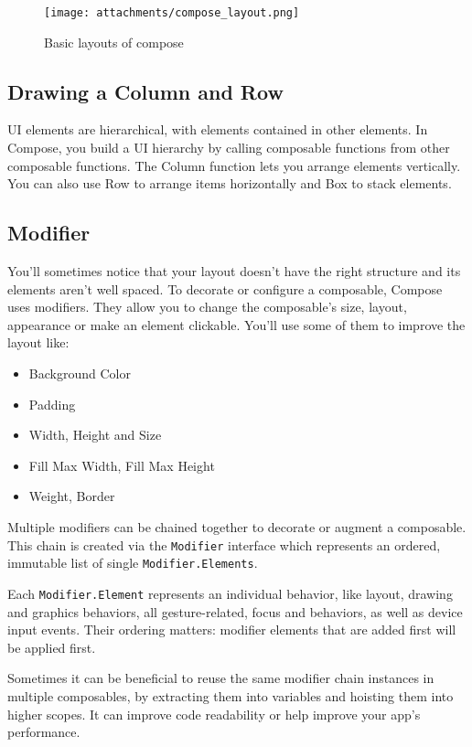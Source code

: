 \documentclass[12pt,oneside]{book}
\begin{document}
\begin{figure}
    \centering
        \texttt{[image: attachments/compose\_layout.png]}
    \caption{Basic layouts of compose}
\end{figure}

        \subsection{Drawing a Column and Row}
UI elements are hierarchical, with elements contained in other elements. In Compose, you build a UI hierarchy by calling composable functions from other composable functions. The Column function lets you arrange elements vertically. You can also use Row to arrange items horizontally and Box to stack elements.

        \subsection{Modifier}
You'll sometimes notice that your layout doesn't have the right structure and its elements aren't well spaced. To decorate or configure a composable, Compose uses modifiers. They allow you to change the composable's size, layout, appearance or make an element clickable. You'll use some of them to improve the layout like:
\begin{itemize}
    \item Background Color
    \item Padding
    \item Width, Height and Size
    \item Fill Max Width, Fill Max Height
    \item Weight, Border
\end{itemize}
Multiple modifiers can be chained together to decorate or augment a composable. This chain is created via the \texttt{Modifier} interface which represents an ordered, immutable list of single \texttt{Modifier.Elements}.

Each \texttt{Modifier.Element} represents an individual behavior, like layout, drawing and graphics behaviors, all gesture-related, focus and behaviors, as well as device input events. Their ordering matters: modifier elements that are added first will be applied first.

Sometimes it can be beneficial to reuse the same modifier chain instances in multiple composables, by extracting them into variables and hoisting them into higher scopes. It can improve code readability or help improve your app's performance.
\end{document}
